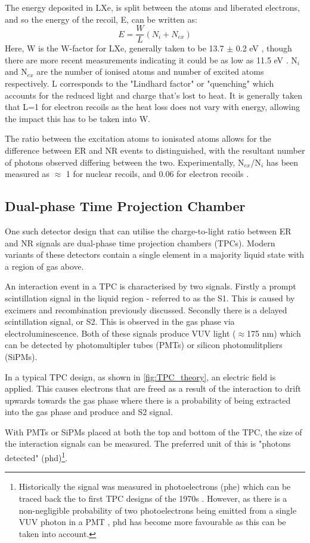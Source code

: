 \par
The energy deposited in LXe, is split between the atoms and liberated electrons, and so the energy of the recoil, E, can be written as:
\begin{equation}
    E = \frac{W}{L}(N_i + N_{ex})
\end{equation}
Here, W is the W-factor for LXe, generally taken to be 13.7 $\pm$ 0.2 eV \cite{light_and_charge_of_xenon_ref}, though there are more recent measurements indicating it could be as low as 11.5 eV \cite{electron_excitation_energy_of_xenon_ref}. 
N$_i$ and N$_{ex}$ are the number of ionised atoms and number of excited atoms respectively.
L corresponds to the "Lindhard factor" or "quenching" which accounts for the reduced light and charge that's lost to heat.
It is generally taken that L=1 for electron recoils as the heat loss does not vary with energy, allowing the impact this has to be taken into W.
\par
The ratio between the excitation atoms to ionisated atoms allows for the difference between ER and NR events to distinguished, with the resultant number of photons observed differing between the two.
Experimentally, N$_{ex}$/N$_i$ has been measured as $\approx$ 1 for nuclear recoils, and 0.06 for electron recoils \cite{ionisation_to_excitation_ratio_xenon_ref}.

\subsection{Dual-phase Time Projection Chamber}
\par
One such detector design that can utilise the charge-to-light ratio between ER and NR signals are dual-phase time projection chambers (TPCs).
Modern variants of these detectors contain a single element in a majority liquid state with a region of gas above.
\par
An interaction event in a TPC is characterised by two signals.
Firstly a prompt scintillation signal in the liquid region - referred to as the S1.
This is caused by excimers and recombination previously discussed.
Secondly there is a delayed scintillation signal, or S2.
This is observed in the gas phase via electroluminescence.
Both of these signals produce VUV light ($\approx$175 nm) which can be detected by photomultipler tubes (PMTs) or silicon photomulitpliers (SiPMs).
\par
In a typical TPC design, as shown in \autoref{fig:TPC_theory}, an electric field is applied.
This causes electrons that are freed as a result of the interaction to drift upwards towards the gas phase where there is a probability of being extracted into the gas phase and produce and S2 signal.
\par
With PMTs or SiPMs placed at both the top and bottom of the TPC, the size of the interaction signals can be measured.
The preferred unit of this is "photons detected" (phd)\footnote{Historically the signal was measured in photoelectrons (phe) which can be traced back the to first TPC designs of the 1970s \cite{tpc_origins_ref}. However, as there is a non-negligible probability of two photoelectrons being emitted from a single VUV photon in a PMT \cite{pmts_in_xenon_ref}, phd has become more favourable as this can be taken into account.}.

